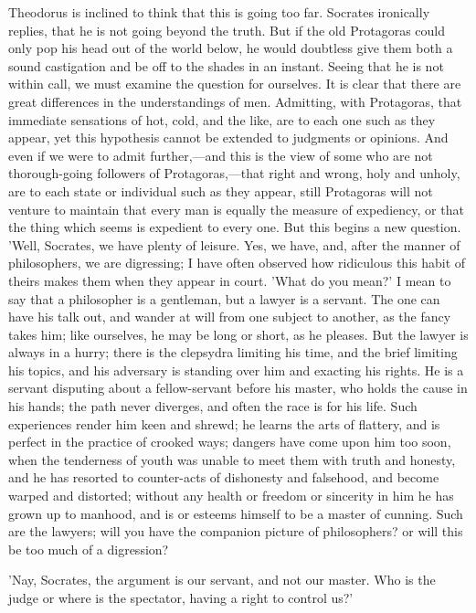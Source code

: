 \documentclass[11pt,letter]{article}
\begin{document}
\par  Theodorus is inclined to think that this is going too far. Socrates ironically replies, that he is not going beyond the truth. But if the old Protagoras could only pop his head out of the world below, he would doubtless give them both a sound castigation and be off to the shades in an instant. Seeing that he is not within call, we must examine the question for ourselves. It is clear that there are great differences in the understandings of men. Admitting, with Protagoras, that immediate sensations of hot, cold, and the like, are to each one such as they appear, yet this hypothesis cannot be extended to judgments or opinions. And even if we were to admit further,—and this is the view of some who are not thorough-going followers of Protagoras,—that right and wrong, holy and unholy, are to each state or individual such as they appear, still Protagoras will not venture to maintain that every man is equally the measure of expediency, or that the thing which seems is expedient to every one. But this begins a new question. 'Well, Socrates, we have plenty of leisure. Yes, we have, and, after the manner of philosophers, we are digressing; I have often observed how ridiculous this habit of theirs makes them when they appear in court. 'What do you mean?' I mean to say that a philosopher is a gentleman, but a lawyer is a servant. The one can have his talk out, and wander at will from one subject to another, as the fancy takes him; like ourselves, he may be long or short, as he pleases. But the lawyer is always in a hurry; there is the clepsydra limiting his time, and the brief limiting his topics, and his adversary is standing over him and exacting his rights. He is a servant disputing about a fellow-servant before his master, who holds the cause in his hands; the path never diverges, and often the race is for his life. Such experiences render him keen and shrewd; he learns the arts of flattery, and is perfect in the practice of crooked ways; dangers have come upon him too soon, when the tenderness of youth was unable to meet them with truth and honesty, and he has resorted to counter-acts of dishonesty and falsehood, and become warped and distorted; without any health or freedom or sincerity in him he has grown up to manhood, and is or esteems himself to be a master of cunning. Such are the lawyers; will you have the companion picture of philosophers? or will this be too much of a digression?

\par  'Nay, Socrates, the argument is our servant, and not our master. Who is the judge or where is the spectator, having a right to control us?'
\end{document}
